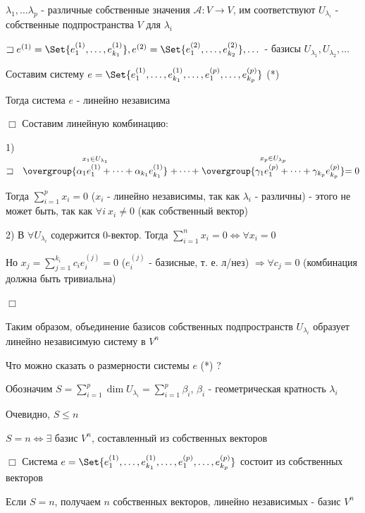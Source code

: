 \documentclass[12pt]{article}
\begin{document}
    \Th $\lambda_1, \dots \lambda_p$ - различные собственные значения $\mathcal{A} : V \rightarrow V$,
    им соответствуют $U_{\lambda_i}$ - собственные подпространства $V$ для $\lambda_i$

    $\sqsupset e^{(1)} = \Set{e^{(1)}_1, \dots, e^{(1)}_{k_1}}, e^{(2)} = \Set{e^{(2)}_1, \dots, e^{(2)}_{k_2}}, \dots$ -
    базисы $U_{\lambda_1}, U_{\lambda_2}, \dots$

    Составим систему $e = \Set{e^{(1)}_1, \dots, e^{(1)}_{k_1}, \dots, e^{(p)}_1, \dots, e^{(p)}_{k_p}}$ (*)

    Тогда система $e$ - линейно независима

    $\Box$ Составим линейную комбинацию:

    1) $\sqsupset \quad \stackrel{x_1 \in U_{\lambda_1}}{\overgroup{\alpha_1 e^{(1)}_1 + \dots + \alpha_{k_1} e^{(1)}_{k_1}}} + \dots +
    \stackrel{x_p \in U_{\lambda_p}}{\overgroup{\gamma_1 e^{(p)}_1 + \dots + \gamma_{k_p} e^{(p)}_{k_p}}} = 0$

    Тогда $\sum_{i=1}^p x_i = 0$ ($x_i$ - линейно независимы, так как $\lambda_i$ - различны) - этого не может быть, так как $\forall i \ x_i \neq 0$ (как собственный вектор)

    2) В $\forall U_{\lambda_i}$ содержится $0$-вектор. Тогда $\sum_{i=1}^n x_i = 0 \Longleftrightarrow \forall x_i = 0$

    Но $x_j = \sum_{j=1}^{k_i} c_i e^{(j)}_i = 0$ ($e^{(j)}_i$ - базисные, т. е. л/нез) $\Longrightarrow \forall c_j = 0$ (комбинация должна быть тривиальна)

    $\Box$

    \Nota Таким образом, объединение базисов собственных подпространств $U_{\lambda_i}$ образует линейно независимую систему в $V^n$

    Что можно сказать о размерности системы $e$ (*) ?

    Обозначим $S = \sum_{i=1}^p \dim U_{\lambda_i} = \sum_{i=1}^p \beta_i$, $\beta_i$ - геометрическая кратность $\lambda_i$

    Очевидно, $S \leq n$

    \Th $S = n \Longleftrightarrow \exists$ базис $V^n$, составленный из собственных векторов

    $\Box$ Система $e = \Set{e^{(1)}_1, \dots, e^{(1)}_{k_1}, \dots, e^{(p)}_1, \dots, e^{(p)}_{k_p}}$ состоит из собственных векторов

    Если $S = n$, получаем $n$ собственных векторов, линейно независимых - базис $V^n$
\end{document}
